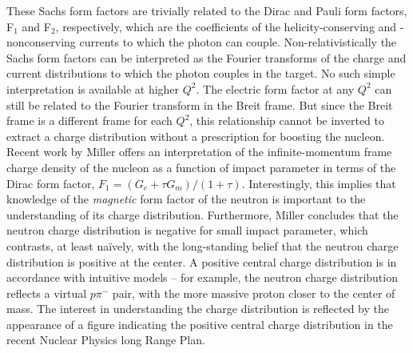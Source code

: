 \documentclass[12pt,letterpaper,oneside]{article}
\begin{document}
These Sachs form factors are trivially related to the Dirac and Pauli
form factors, F$_1$ and F$_2$, respectively,  which are
the coefficients of the 
helicity-conserving and -nonconserving currents to
which the photon can couple.  Non-relativistically the Sachs form
factors can be interpreted as the Fourier transforms of the charge and
current distributions to which the photon couples in the target.  No
such simple interpretation is available at higher $Q^2$.  The electric
form factor at any $Q^2$ can still be related to the Fourier transform
in the Breit frame.  But since the Breit frame is a different frame
for each $Q^2$, this relationship cannot be inverted to extract a
charge distribution without a prescription for boosting the nucleon. 
Recent work \cite{Miller} by Miller offers an interpretation of 
the infinite-momentum frame charge density of
the nucleon as a function of impact parameter in terms of the Dirac
form factor, $F_1=(G_e+\tau G_m)/(1+\tau)$.  Interestingly, this
implies that knowledge of the {\em magnetic} form factor of the
neutron is important to the understanding of its charge distribution.
Furthermore, Miller concludes that 
the neutron charge distribution is negative for small impact parameter,
which contrasts, at least na\"ively, with the long-standing 
belief that the neutron charge distribution is positive at the center.
A positive central charge distribution is in accordance with 
intuitive models --
for example, the neutron charge distribution reflects a virtual $p\pi^-$
pair, with the more massive proton closer to the center of mass.
The interest in understanding the charge distribution is
reflected by the appearance of a figure indicating 
the positive central charge distribution in the recent
Nuclear Physics long Range Plan.
\end{document}
